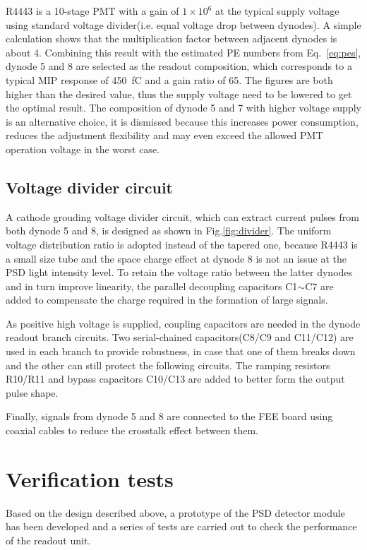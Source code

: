 \documentclass[5p, times]{elsarticle}
\begin{document}
R4443 is a 10-stage PMT with a gain of $1\times10^6$ at the typical supply voltage using standard voltage divider(i.e. equal voltage drop between dynodes).
A simple calculation shows that the multiplication factor between adjacent dynodes is about 4.
Combining this result with the estimated PE numbers from Eq.~\ref{eq:pes}, dynode 5 and 8 are selected as the readout composition, which corresponds to a typical MIP response of \SI{450}{\femto\coulomb} and a gain ratio of 65.
The figures are both higher than the desired value, thus the supply voltage need to be lowered to get the optimal result.
The composition of dynode 5 and 7 with higher voltage supply is an alternative choice, it is dismissed because this increases power consumption, reduces the adjustment flexibility and may even exceed the allowed PMT operation voltage in the worst case.

\subsection{Voltage divider circuit}
\label{sec:divider_design}
A cathode grouding voltage divider circuit, which can extract current pulses from both dynode 5 and 8, is designed as shown in Fig.\ref{fig:divider}.
The uniform voltage distribution ratio is adopted instead of the tapered one, because R4443 is a small size tube and the space charge effect at dynode 8 is not an issue at the PSD light intensity level.
To retain the voltage ratio between the latter dynodes and in turn improve linearity, the parallel decoupling capacitors C1$\sim$C7 are added to compensate the charge required in the formation of large signals.

As positive high voltage is supplied, coupling capacitors are needed in the dynode readout branch circuits.
Two serial-chained capacitors(C8/C9 and C11/C12) are used in each branch to provide robustness, in case that one of them breaks down and the other can still protect the following circuits.  
The ramping resistors R10/R11 and bypass capacitors C10/C13 are added to better form the output pulse shape.

Finally, signals from dynode 5 and 8 are connected to the FEE board using coaxial cables to reduce the crosstalk effect between them.

\section{Verification tests}
\label{sec:result}
Based on the design described above, a prototype of the PSD detector module has been developed and a series of tests are carried out to check the performance of the readout unit.
\end{document}
